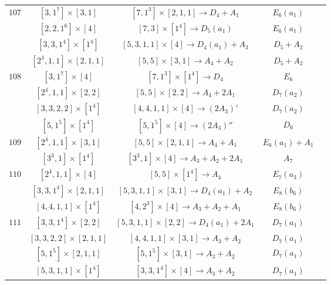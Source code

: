 \documentclass[reqno,12pt]{amsart}
\numberwithin{equation}{section}
\theoremstyle{plain}
\theoremstyle{definition}
\begin{document}
\begin{table}[htbp]
\begin{tabular}{|c|c|c|c|c|}
$ 107$   &  $ [3,1^7]\times [3,1] $  & $[7,1^3]\times [2,1,1]\rightarrow      D_4+A_1 $  &   $E_6(a_1)$        \\ 
&  $ [2,2,1^6]\times [4] $  & $[7,3]\times [1^4]\rightarrow      D_5(a_1)$  &   $E_6(a_1) $        \\
&  $ [3,3,1^4]\times [1^4] $  & $[5,3,1,1]\times [4]\rightarrow      D_4(a_1)+A_3 $  &   $D_5+A_2$        \\

&  $ [2^4,1,1]\times [2,1,1] $  & $[5,5]\times [3,1]\rightarrow      A_4+A_2 $  &   $D_5+A_2$        \\
\hline

$ 108$   &  $ [3,1^7]\times [4] $  & $[7,1^3]\times [1^4]\rightarrow      D_4 $  &   $E_6$        \\ 
&  $ [2^4,1,1]\times [2,2] $  & $[5,5]\times [2,2]\rightarrow      A_4+2A_1$  &   $D_7(a_2) $        \\
& \small{  $ [3,3,2,2]\times [1^4] $ } & $[4,4,1,1]\times [4]\rightarrow      (2A_3)' $ &   $D_7(a_2)$        \\

&  $ [5,1^5]\times [1^4] $   & $[5,1^5]\times [4]\rightarrow      (2A_3)''$   &   $D_6$        \\
\hline

$ 109$  
&  $ [2^4,1,1]\times [3,1] $  & $[5,5]\times [2,1,1]\rightarrow      A_4+A_1$  &   $E_6(a_1) +A_1$        \\
&  $ [3^3,1]\times [1^4] $ & $[3^3,1]\times [4]\rightarrow      A_3+A_2+2A_1 $  &   $A_7$        \\ \hline
$ 110$  
&  $ [2^4,1,1]\times [4] $  & $[5,5]\times [1^4]\rightarrow      A_4$  &   $E_7(a_3)$        \\
&  $ [3,3,1^4]\times [2,1,1] $ & $[5,3,1,1]\times [3,1]\rightarrow      D_4(a_1)+A_2$  &   $E_8(b_6)$        \\
&  $ [4,4,1,1]\times [1^4] $ & $[4,2^3]\times [4]\rightarrow      A_3+A_2+A_1$  &   $E_8(b_6)$        \\
\hline

$ 111$  
&  $ [3,3,1^4]\times [2,2] $ & \footnotesize{$[5,3,1,1]\times [2,2]\rightarrow      D_4(a_1)+2A_1$ } &   $D_7(a_1)$        \\
&  $ [3,3,2,2]\times [2,1,1] $ & $[4,4,1,1]\times [3,1]\rightarrow      A_3+A_2$  &   $D_7(a_1)$        \\
&  $ [5,1^5]\times [2,1,1] $ & $[5,1^5]\times [3,1]\rightarrow      A_3+A_2$  &   $D_7(a_1)$        \\
&  $ [5,3,1,1]\times [1^4] $ & $[3,3,1^4]\times [4]\rightarrow      A_3+A_2$  &   $D_7(a_1)$        \\
\hline



\end{tabular}
\end{table}
\end{document}
